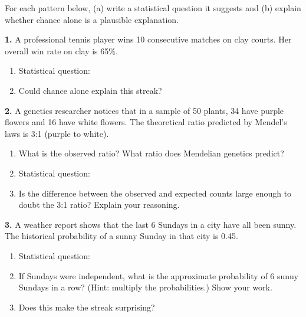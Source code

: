 \documentclass[10pt]{article}
\begin{document}
\namedateperiod

\vspace{0.1in}

\begin{practicebox}
\small
For each pattern below, (a) write a statistical question it suggests and (b) explain
whether chance alone is a plausible explanation.

\vspace{8pt}
\textbf{1.} A professional tennis player wins 10 consecutive matches on clay courts.
Her overall win rate on clay is 65\%.

\begin{enumerate}[label=(\alph*), leftmargin=2em, itemsep=8pt]
  \item Statistical question: \writeline\writeline
  \item Could chance alone explain this streak? \writeline\writeline
\end{enumerate}

\vspace{8pt}
\textbf{2.} A genetics researcher notices that in a sample of 50 plants, 34 have
purple flowers and 16 have white flowers. The theoretical ratio predicted by Mendel's
laws is 3:1 (purple to white).

\begin{enumerate}[label=(\alph*), leftmargin=2em, itemsep=8pt]
  \item What is the observed ratio? \blank{3cm} \quad
        What ratio does Mendelian genetics predict? \blank{3cm}
  \item Statistical question: \writeline\writeline
  \item Is the difference between the observed and expected counts large enough to doubt
        the 3:1 ratio? Explain your reasoning. \writeline\writeline
\end{enumerate}

\vspace{8pt}
\textbf{3.} A weather report shows that the last 6 Sundays in a city have all been
sunny. The historical probability of a sunny Sunday in that city is 0.45.

\begin{enumerate}[label=(\alph*), leftmargin=2em, itemsep=8pt]
  \item Statistical question: \writeline\writeline
  \item If Sundays were independent, what is the approximate probability of 6 sunny
        Sundays in a row? (Hint: multiply the probabilities.) Show your work.
        \vspace{20pt}
  \item Does this make the streak surprising? \writeline
\end{enumerate}


\end{practicebox}
\end{document}
